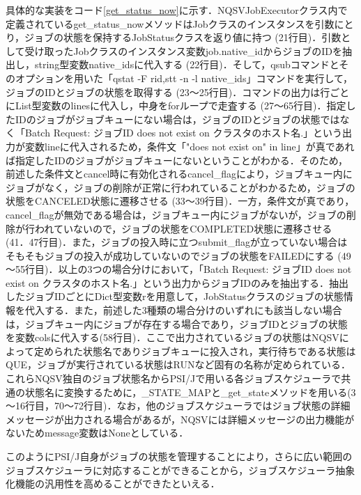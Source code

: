 具体的な実装をコード\ref{get_status_now}に示す．NQSVJobExecutorクラス内で定義されているget\_status\_nowメソッドはJobクラスのインスタンスを引数にとり，ジョブの状態を保持するJobStatusクラスを返り値に持つ (21行目)．引数として受け取ったJobクラスのインスタンス変数job.native\_idからジョブのIDを抽出し，string型変数native\_idsに代入する (22行目)．そして，qsubコマンドとそのオプションを用いた「qstat -F rid,stt -n -l native\_ids」コマンドを実行して，ジョブのIDとジョブの状態を取得する (23～25行目)\cite{nqsv_reference}．コマンドの出力は行ごとにList型変数のlinesに代入し，中身をforループで走査する (27～65行目)．指定したIDのジョブがジョブキューにない場合は，ジョブのIDとジョブの状態ではなく「Batch Request: ジョブID does not exist on クラスタのホスト名.」という出力が変数lineに代入されるため，条件文「"does not exist on" in line」が真であれば指定したIDのジョブがジョブキューにないということがわかる．そのため，前述した条件文とcancel時に有効化されるcancel\_flagにより，ジョブキュー内にジョブがなく，ジョブの削除が正常に行われていることがわかるため，ジョブの状態をCANCELED状態に遷移させる (33～39行目)．一方，条件文が真であり，cancel\_flagが無効である場合は，ジョブキュー内にジョブがないが，ジョブの削除が行われていないので，ジョブの状態をCOMPLETED状態に遷移させる (41．47行目)．また，ジョブの投入時に立つsubmit\_flagが立っていない場合はそもそもジョブの投入が成功していないのでジョブの状態をFAILEDにする (49～55行目)．以上の3つの場合分けにおいて，「Batch Request: ジョブID does not exist on クラスタのホスト名.」という出力からジョブIDのみを抽出する．抽出したジョブIDごとにDict型変数rを用意して，JobStatusクラスのジョブの状態情報を代入する．また，前述した3種類の場合分けのいずれにも該当しない場合は，ジョブキュー内にジョブが存在する場合であり，ジョブIDとジョブの状態を変数colsに代入する(58行目)．ここで出力されているジョブの状態はNQSVによって定められた状態名でありジョブキューに投入され，実行待ちである状態はQUE，ジョブが実行されている状態はRUNなど固有の名称が定められている．これらNQSV独自のジョブ状態名からPSI/Jで用いる各ジョブスケジューラで共通の状態名に変換するために，\_STATE\_MAPと\_get\_stateメソッドを用いる(3～16行目，70～72行目)．なお，他のジョブスケジューラではジョブ状態の詳細メッセージが出力される場合があるが，NQSVには詳細メッセージの出力機能がないためmessage変数はNoneとしている．\par
このようにPSI/J自身がジョブの状態を管理することにより，さらに広い範囲のジョブスケジューラに対応することができることから，ジョブスケジューラ抽象化機能の汎用性を高めることができたといえる．\par

